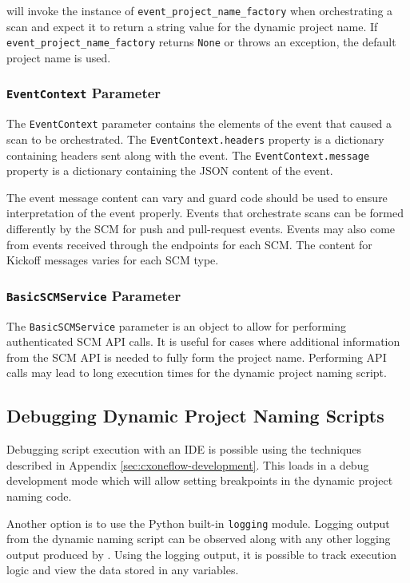 \cxoneflow will invoke the instance of \texttt{event\_project\_name\_factory} when orchestrating a scan and expect
it to return a string value for the dynamic project name.  If \texttt{event\_project\_name\_factory} returns \texttt{None}
or throws an exception, the default project name is used.

\subsubsection{\texttt{EventContext} Parameter}

The \texttt{EventContext} parameter contains the elements of the event that caused a scan to be orchestrated.
The \texttt{EventContext.headers} property is a dictionary containing headers sent along with the event.  The
\texttt{EventContext.message} property is a dictionary containing the JSON content of the event.

The event message content can vary and guard code should be used to ensure interpretation of the event properly.
Events that orchestrate scans can be formed differently by the SCM for push and pull-request events.  Events may also
come from events received through the  endpoints for each SCM.  The content for Kickoff
messages varies for each SCM type.

\subsubsection{\texttt{BasicSCMService} Parameter}

The \texttt{BasicSCMService} parameter is an object to allow for performing authenticated SCM API calls.  It is useful for
cases where additional information from the SCM API is needed to fully form the project name.  Performing API calls may
lead to long execution times for the dynamic project naming script.

\subsection{Debugging Dynamic Project Naming Scripts}

Debugging script execution with an IDE is possible using the techniques described in Appendix \ref{sec:cxoneflow-development}.
This loads \cxoneflow in a debug development mode which will allow setting breakpoints in the dynamic project naming code.

Another option is to use the Python built-in \texttt{logging} module.  Logging output from the dynamic naming script can be
observed along with any other logging output produced by \cxoneflowns.  Using the logging output, it is possible to track
execution logic and view the data stored in any variables.

